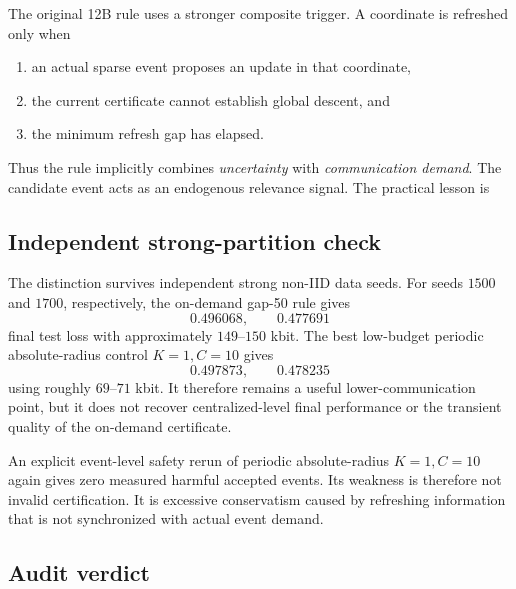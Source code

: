The original 12B rule uses a stronger composite trigger. A coordinate is refreshed only when
\begin{enumerate}
  \item an actual sparse event proposes an update in that coordinate,
  \item the current certificate cannot establish global descent, and
  \item the minimum refresh gap has elapsed.
\end{enumerate}
Thus the rule implicitly combines \emph{uncertainty} with \emph{communication demand}. The candidate event acts as an endogenous relevance signal. The practical lesson is
\begin{center}
\end{center}

\subsection{Independent strong-partition check}

The distinction survives independent strong non-IID data seeds. For seeds $1500$ and $1700$, respectively, the on-demand gap-50 rule gives
\begin{equation}
  0.496068,\qquad0.477691
\end{equation}
final test loss with approximately $149$--$150$ kbit. The best low-budget periodic absolute-radius control $K=1,C=10$ gives
\begin{equation}
  0.497873,\qquad0.478235
\end{equation}
using roughly $69$--$71$ kbit. It therefore remains a useful lower-communication point, but it does not recover centralized-level final performance or the transient quality of the on-demand certificate.

An explicit event-level safety rerun of periodic absolute-radius $K=1,C=10$ again gives zero measured harmful accepted events. Its weakness is therefore not invalid certification. It is excessive conservatism caused by refreshing information that is not synchronized with actual event demand.

\subsection{Audit verdict}

